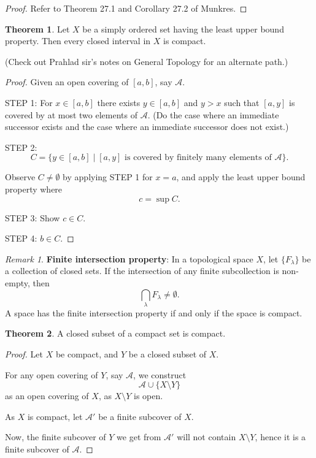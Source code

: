 \documentclass[11pt]{article}
\theoremstyle{definition}
\newtheorem{theorem}{Theorem}[section]
\theoremstyle{remark}
\newtheorem{remark}{Remark}[section]
\begin{document}
\begin{proof}
Refer to Theorem 27.1 and Corollary 27.2 of Munkres.
\end{proof}

\begin{theorem}\label{thm:closed_interval_compact}
Let $X$ be a simply ordered set having the least upper bound property. Then every closed interval in $X$ is compact.

(Check out Prahlad sir's notes on General Topology for an alternate path.)
\end{theorem}

\begin{proof}
Given an open covering of $[a,b]$, say $\mathcal A$.

STEP 1: For $x\in[a,b]$ there exists $y\in[a,b]$ and $y>x$ such that $[a,y]$ is covered by at most two elements of $\mathcal A$. (Do the case where an immediate successor exists and the case where an immediate successor does not exist.)

STEP 2:
\[
C=\{y\in[a,b]\mid [a,y]\text{ is covered by finitely many elements of }\mathcal A\}.
\]

Observe $C\neq\emptyset$ by applying STEP 1 for $x=a$, and apply the least upper bound property where
\[
c=\sup C.
\]

STEP 3: Show $c\in C$.

STEP 4: $b\in C$.
\end{proof}

\begin{remark}\label{rem:finite_intersection_property}
\textbf{Finite intersection property}: In a topological space $X$, let $\{F_\lambda\}$ be a collection of closed sets. If the intersection of any finite subcollection is non-empty, then
\[
\bigcap_\lambda F_\lambda\neq\emptyset.
\]
A space has the finite intersection property if and only if the space is compact.
\end{remark}

\begin{theorem}\label{thm:closed_subset_compact}
A closed subset of a compact set is compact.
\end{theorem}

\begin{proof}
Let $X$ be compact, and $Y$ be a closed subset of $X$.

For any open covering of $Y$, say $\mathcal A$, we construct
\[
\mathcal A\cup\{X\setminus Y\}
\]
as an open covering of $X$, as $X\setminus Y$ is open.

As $X$ is compact, let $\mathcal A'$ be a finite subcover of $X$.

Now, the finite subcover of $Y$ we get from $\mathcal A'$ will not contain $X\setminus Y$, hence it is a finite subcover of $\mathcal A$.
\end{proof}
\end{document}

